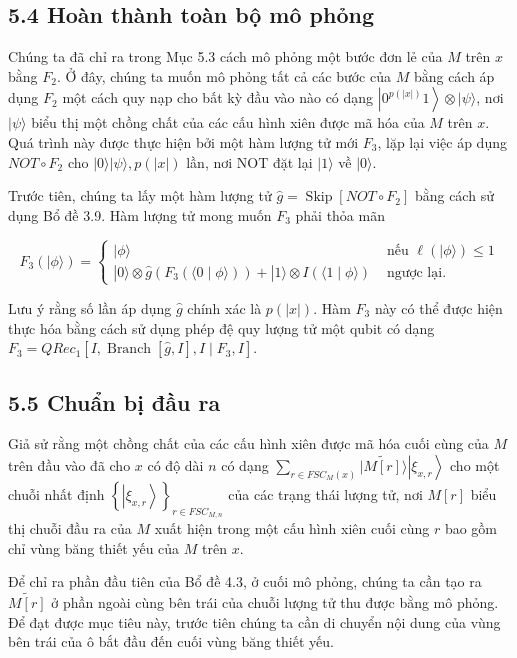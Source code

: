 \documentclass[10pt]{article}
\begin{document}
\subsection*{5.4 Hoàn thành toàn bộ mô phỏng}
Chúng ta đã chỉ ra trong Mục 5.3 cách mô phỏng một bước đơn lẻ của $M$ trên $x$ bằng $F_{2}$. Ở đây, chúng ta muốn mô phỏng tất cả các bước của $M$ bằng cách áp dụng $F_{2}$ một cách quy nạp cho bất kỳ đầu vào nào có dạng $\left|0^{p(|x|)} 1\right\rangle \otimes|\psi\rangle$, nơi $|\psi\rangle$ biểu thị một chồng chất của các cấu hình xiên được mã hóa của $M$ trên $x$. Quá trình này được thực hiện bởi một hàm lượng tử mới $F_{3}$, lặp lại việc áp dụng $N O T \circ F_{2}$ cho $|0\rangle|\psi\rangle, p(|x|)$ lần, nơi NOT đặt lại $|1\rangle$ về $|0\rangle$.

Trước tiên, chúng ta lấy một hàm lượng tử $\hat{g}=\operatorname{Skip}\left[N O T \circ F_{2}\right]$ bằng cách sử dụng Bổ đề 3.9. Hàm lượng tử mong muốn $F_{3}$ phải thỏa mãn

$$
F_{3}(|\phi\rangle)= \begin{cases}|\phi\rangle & \text { nếu } \ell(|\phi\rangle) \leq 1 \\ |0\rangle \otimes \hat{g}\left(F_{3}(\langle 0 \mid \phi\rangle)\right)+|1\rangle \otimes I(\langle 1 \mid \phi\rangle) & \text { ngược lại. }\end{cases}
$$

Lưu ý rằng số lần áp dụng $\hat{g}$ chính xác là $p(|x|)$. Hàm $F_{3}$ này có thể được hiện thực hóa bằng cách sử dụng phép đệ quy lượng tử một qubit có dạng $F_{3}=Q R e c_{1}\left[I, \operatorname{Branch}[\hat{g}, I], I \mid F_{3}, I\right]$.

\subsection*{5.5 Chuẩn bị đầu ra}
Giả sử rằng một chồng chất của các cấu hình xiên được mã hóa cuối cùng của $M$ trên đầu vào đã cho $x$ có độ dài $n$ có dạng $\sum_{r \in F S C_{M}(x)}|\widetilde{M[r]}\rangle\left|\xi_{x, r}\right\rangle$ cho một chuỗi nhất định $\left\{\left|\xi_{x, r}\right\rangle\right\}_{r \in F S C_{M, n}}$ của các trạng thái lượng tử, nơi $M[r]$ biểu thị chuỗi đầu ra của $M$ xuất hiện trong một cấu hình xiên cuối cùng $r$ bao gồm chỉ vùng băng thiết yếu của $M$ trên $x$.

Để chỉ ra phần đầu tiên của Bổ đề 4.3, ở cuối mô phỏng, chúng ta cần tạo ra $\widetilde{M[r]}$ ở phần ngoài cùng bên trái của chuỗi lượng tử thu được bằng mô phỏng. Để đạt được mục tiêu này, trước tiên chúng ta cần di chuyển nội dung của vùng bên trái của ô bắt đầu đến cuối vùng băng thiết yếu.
\end{document}
